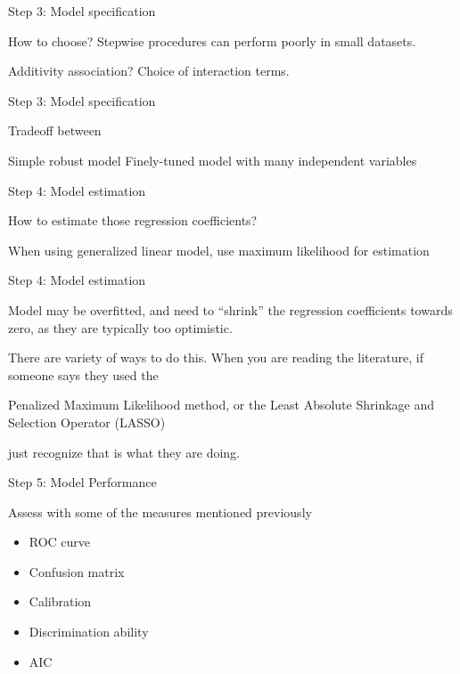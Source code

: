 \documentclass[
  12pt,
  ignorenonframetext,
]{beamer}
\providecommand{\tightlist}{%
  \setlength{\itemsep}{0pt}\setlength{\parskip}{0pt}}
\begin{document}
\begin{frame}{Step 3: Model specification}
\protect\hypertarget{step-3-model-specification}{}

How to choose? Stepwise procedures can perform poorly in small datasets.

Additivity association? Choice of interaction terms.

\end{frame}

\begin{frame}{Step 3: Model specification}
\protect\hypertarget{step-3-model-specification-1}{}

Tradeoff between

Simple robust model Finely-tuned model with many independent variables

\end{frame}

\begin{frame}{Step 4: Model estimation}
\protect\hypertarget{step-4-model-estimation}{}

How to estimate those regression coefficients?

When using generalized linear model, use maximum likelihood for
estimation

\end{frame}

\begin{frame}{Step 4: Model estimation}
\protect\hypertarget{step-4-model-estimation-1}{}

Model may be overfitted, and need to ``shrink'' the regression
coefficients towards zero, as they are typically too optimistic.

There are variety of ways to do this. When you are reading the
literature, if someone says they used the

Penalized Maximum Likelihood method, or the Least Absolute Shrinkage and
Selection Operator (LASSO)

just recognize that is what they are doing.

\end{frame}

\begin{frame}{Step 5: Model Performance}
\protect\hypertarget{step-5-model-performance}{}

Assess with some of the measures mentioned previously

\begin{itemize}[<+->]
\tightlist
\item
  ROC curve
\item
  Confusion matrix
\item
  Calibration
\item
  Discrimination ability
\item
  AIC
\end{itemize}

\end{frame}
\end{document}
